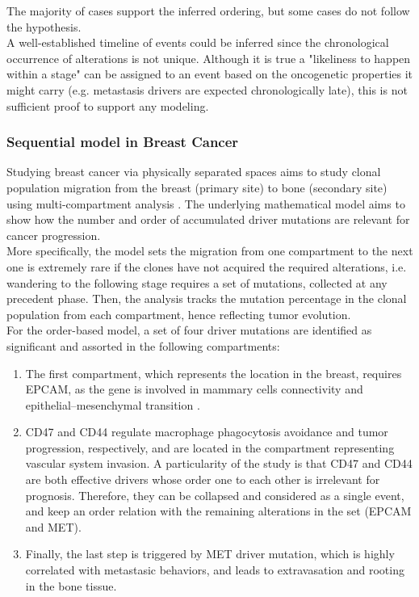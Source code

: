 The majority of cases support the inferred ordering, but some cases do not follow the hypothesis.
\\

A well-established timeline of events could be inferred since the chronological occurrence of alterations is not unique. Although it is true a "likeliness to happen within a stage" can be assigned to an event based on the oncogenetic properties it might carry (e.g. metastasis drivers are expected chronologically late), this is not sufficient proof to support any modeling.

\subsubsection{Sequential model in Breast Cancer}
\label{gene-breast}
Studying breast cancer via physically separated spaces aims to study clonal population migration from the breast (primary site) to bone (secondary site) using multi-compartment analysis \cite{Ascolani2019ModelingMatter}. The underlying mathematical model aims to show how the number and order of accumulated driver mutations are relevant for cancer progression.
\\

More specifically, the model sets the migration from one compartment to the next one is extremely rare if the clones have not acquired the required alterations, i.e. wandering to the following stage requires a set of mutations, collected at any precedent phase. Then, the analysis tracks the mutation percentage in the clonal population from each compartment, hence
reflecting tumor evolution.
\\

For the order-based model, a set of four driver mutations are identified as significant and assorted in the following compartments:

\begin{enumerate}
    \item The first compartment, which represents the location in the breast, requires EPCAM, as the gene is involved in mammary cells connectivity and epithelial–mesenchymal transition \cite{Kalluri2009TheTransition}.
    \item CD47 and CD44 regulate macrophage phagocytosis avoidance and tumor progression, respectively, and are located in the compartment representing vascular system invasion. A particularity of the study is that CD47 and CD44 are both effective drivers whose order one to each other is irrelevant for prognosis. Therefore, they can be collapsed and considered as a single event, and keep an order relation with the remaining alterations in the set (EPCAM and MET).
    \item Finally, the last step is triggered by MET driver mutation, which is highly correlated with metastasic behaviors, and leads to extravasation and rooting in the bone tissue.
\end{enumerate}

